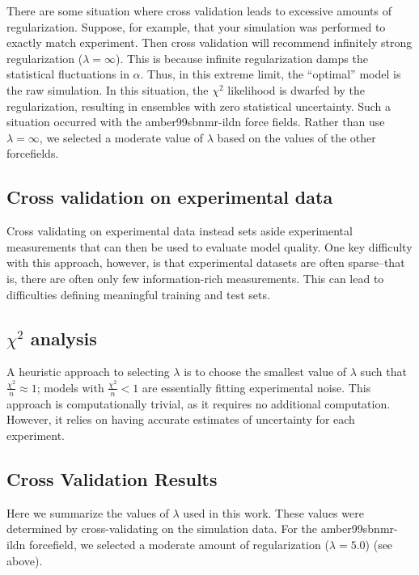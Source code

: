 \documentclass[journal=jacsat,manuscript=article]{achemso}
\begin{document}
There are some situation where cross validation leads to excessive amounts of regularization.  Suppose, for example, that your simulation was performed to exactly match experiment.  Then cross validation will recommend infinitely strong regularization ($\lambda = \infty$).  This is because infinite regularization damps the statistical fluctuations in $\alpha$.  Thus, in this extreme limit, the ``optimal'' model is the raw simulation.  In this situation, the $\chi^2$ likelihood is dwarfed by the regularization, resulting in ensembles with zero statistical uncertainty.  Such a situation occurred with the amber99sbnmr-ildn force fields.  Rather than use $\lambda = \infty$, we selected a moderate value of $\lambda$ based on the values of the other forcefields.  


\subsection{Cross validation on experimental data}

Cross validating on experimental data instead sets aside experimental measurements that can then be used to evaluate model quality.  One key difficulty with this approach, however, is that experimental datasets are often sparse--that is, there are often only few information-rich measurements.  This can lead to difficulties defining meaningful training and test sets.  

\subsection{$\chi^2$ analysis}

A heuristic approach to selecting $\lambda$ is to choose the smallest value of $\lambda$ such that $\frac{\chi^2}{n} \approx 1$; models with $\frac{\chi^2}{n} < 1$ are essentially fitting experimental noise.  This approach is computationally trivial, as it requires no additional computation.  However, it relies on having accurate estimates of uncertainty for each experiment.  

\subsection{Cross Validation Results}

Here we summarize the values of $\lambda$ used in this work.  These values were determined by cross-validating on the simulation data.  For the amber99sbnmr-ildn forcefield, we selected a moderate amount of regularization ($\lambda = 5.0$) (see above).  
\end{document}
